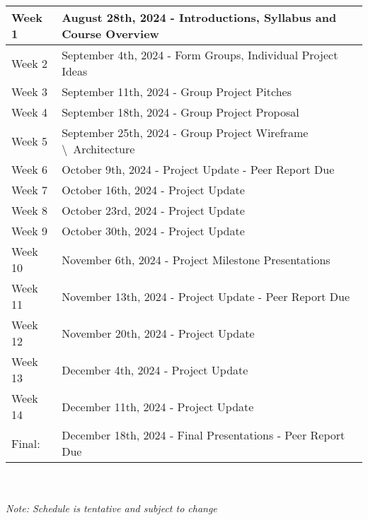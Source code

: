 \renewcommand{\arraystretch}{1.5}



\begin{tabular}{ | l | l |  }
    \hline
    Week 1 & August 28th, 2024 - Introductions, Syllabus and Course Overview \\
    \hline
    Week 2 & September 4th, 2024 - Form Groups, Individual Project Ideas \\
    \hline
    Week 3 & September 11th, 2024 - Group Project Pitches \\ 
    \hline
    Week 4 & September 18th, 2024 - Group Project Proposal \\ 
    \hline
    Week 5 & September 25th, 2024 - Group Project Wireframe \textbackslash \ Architecture\\ 
    \hline
    Week 6 & October 9th, 2024 - Project Update - Peer Report Due \\ 
    \hline
    Week 7 & October 16th, 2024 - Project Update \\ 
    \hline
    Week 8 & October 23rd, 2024 - Project Update \\ 
    \hline
    Week 9 & October 30th, 2024 - Project Update \\ 
    \hline
    Week 10 & November 6th, 2024 - Project Milestone Presentations \\ 
    \hline
    Week 11 & November 13th, 2024 - Project Update - Peer Report Due \\ 
    \hline
    Week 12 & November 20th, 2024 - Project Update \\ 
    \hline
    Week 13 & December 4th, 2024 - Project Update \\ 
    \hline
    Week 14 & December 11th, 2024 - Project Update \\ 
    \hline
    Final: & December 18th, 2024 - Final Presentations - Peer Report Due \\ 
    \hline
\end{tabular}
\\ \\
\textit{Note: Schedule is tentative and subject to change}
